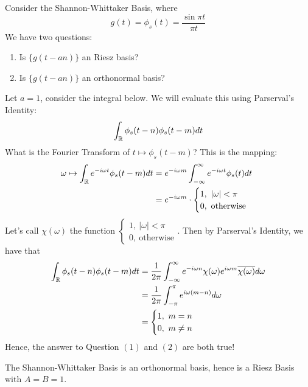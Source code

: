 \documentclass{article}
\begin{document}
\begin{example}
    Consider the Shannon-Whittaker Basis, where
    \[g(t) = \phi_s(t) = \frac{\sin \pi t}{\pi t}\]
    We have two questions:
    \begin{enumerate}
        \item Is $\{g(t - an)\}$ an Riesz basis?
        \item Is $\{g(t - an)\}$ an orthonormal basis?
    \end{enumerate}
    Let $a = 1$, consider the integral below. We will evaluate this using Parserval's Identity:
    \begin{align*}
        \int_{\mathbb{R}} \phi_s(t - n) \phi_s(t - m) dt
    \end{align*}
    What is the Fourier Transform of $t \mapsto \phi_s(t - m)$? This is the mapping:
    \begin{align*}
        \omega \mapsto \int_{\mathbb{R}} e^{-i\omega t} \phi_s(t - m) dt &= e^{-i\omega m} \int_{-\infty}^\infty e^{-i\omega t} \phi_s(t) dt\\
        &= e^{-i\omega m} \cdot \begin{cases}
            1,\ |\omega| < \pi\\
            0,\ \text{otherwise}
        \end{cases}
    \end{align*}
    Let's call $\chi(\omega)$ the function $\begin{cases}
            1,\ |\omega| < \pi\\
            0,\ \text{otherwise}
        \end{cases}$. Then by Parserval's Identity, we have that
    \begin{align*}
            \int_{\mathbb{R}} \phi_s(t - n) \phi_s(t - m) dt &=\frac{1}{2\pi} \int_{-\infty}^\infty e^{-i\omega n} \chi(\omega) e^{i\omega m} \overline{\chi(\omega)} d\omega\\
            &= \frac{1}{2\pi} \int_{-\pi}^\pi e^{i\omega (m - n)} d\omega\\
            &= \begin{cases}
                1,\ m = n\\
                0,\ m \neq n
            \end{cases}
    \end{align*}
    Hence, the answer to Question $(1)$ and $(2)$ are both true!
\end{example}

\begin{corollary}
    The Shannon-Whittaker Basis is an orthonormal basis, hence is a Riesz Basis with $A = B = 1$.
\end{corollary}
\end{document}
